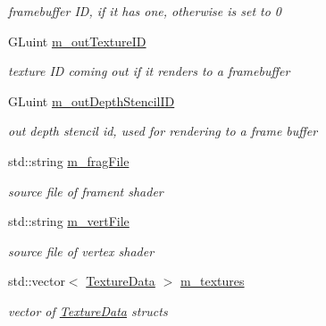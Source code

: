 \begin{DoxyCompactItemize}
\begin{DoxyCompactList}\small\item\em framebuffer I\-D, if it has one, otherwise is set to 0 \end{DoxyCompactList}\item 
\hypertarget{struct_shader_pro_a710261840d8482d848970b1b8967f828}{G\-Luint \hyperlink{struct_shader_pro_a710261840d8482d848970b1b8967f828}{m\-\_\-out\-Texture\-I\-D}}\label{struct_shader_pro_a710261840d8482d848970b1b8967f828}

\begin{DoxyCompactList}\small\item\em texture I\-D coming out if it renders to a framebuffer \end{DoxyCompactList}\item 
\hypertarget{struct_shader_pro_a604a470b247093aa492537ce53f41442}{G\-Luint \hyperlink{struct_shader_pro_a604a470b247093aa492537ce53f41442}{m\-\_\-out\-Depth\-Stencil\-I\-D}}\label{struct_shader_pro_a604a470b247093aa492537ce53f41442}

\begin{DoxyCompactList}\small\item\em out depth stencil id, used for rendering to a frame buffer \end{DoxyCompactList}\item 
\hypertarget{struct_shader_pro_a29aae1d3375fa42b3c78b1cb035e2675}{std\-::string \hyperlink{struct_shader_pro_a29aae1d3375fa42b3c78b1cb035e2675}{m\-\_\-frag\-File}}\label{struct_shader_pro_a29aae1d3375fa42b3c78b1cb035e2675}

\begin{DoxyCompactList}\small\item\em source file of frament shader \end{DoxyCompactList}\item 
\hypertarget{struct_shader_pro_aea0734e5aa1dc6ddf7b7bdd20f235848}{std\-::string \hyperlink{struct_shader_pro_aea0734e5aa1dc6ddf7b7bdd20f235848}{m\-\_\-vert\-File}}\label{struct_shader_pro_aea0734e5aa1dc6ddf7b7bdd20f235848}

\begin{DoxyCompactList}\small\item\em source file of vertex shader \end{DoxyCompactList}\item 
\hypertarget{struct_shader_pro_afa957000f293f2fb4217f28f0db321ec}{std\-::vector$<$ \hyperlink{struct_texture_data}{Texture\-Data} $>$ \hyperlink{struct_shader_pro_afa957000f293f2fb4217f28f0db321ec}{m\-\_\-textures}}\label{struct_shader_pro_afa957000f293f2fb4217f28f0db321ec}

\begin{DoxyCompactList}\small\item\em vector of \hyperlink{struct_texture_data}{Texture\-Data} structs \end{DoxyCompactList}\end{DoxyCompactItemize}


